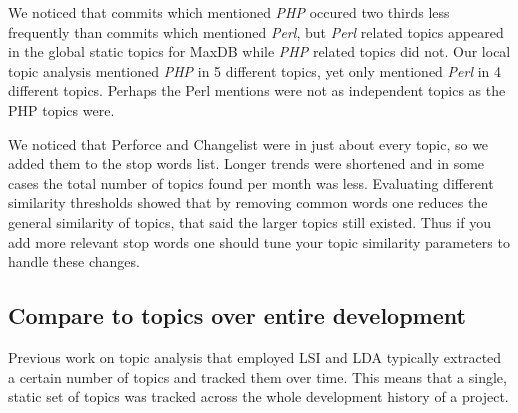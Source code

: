 \documentclass[times, 10pt,twocolumn]{article}
\begin{document}
We noticed that commits which mentioned \emph{PHP} occured two thirds
less frequently than commits which mentioned \emph{Perl}, but
\emph{Perl} related topics appeared in the global static topics for
MaxDB while \emph{PHP} related topics did not.  Our local topic
analysis mentioned \emph{PHP} in 5 different topics, yet only
mentioned \emph{Perl} in 4 different topics. Perhaps the Perl mentions
were not as independent topics as the PHP topics were.

We noticed that Perforce and Changelist were in just about every
topic, so we added them to the stop words list. Longer trends were
shortened and in some cases the total number of topics found per month
was less. Evaluating different similarity thresholds showed that by
removing common words one reduces the general similarity of topics,
that said the larger topics still existed. Thus if you add more
relevant stop words one should tune your topic similarity parameters
to handle these changes.

















\subsection{Compare to topics over entire development}





Previous work on topic analysis that employed LSI and LDA typically
extracted a certain number of topics and tracked them over time. This
means that a single, static set of topics was tracked across the whole
development history of a project. 
\end{document}
